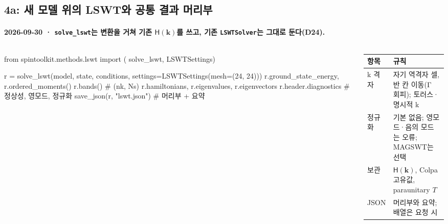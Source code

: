 \subsection{4a: 새 모델 위의 LSWT와 공통 결과 머리부}\label{stage4a-api}
\begingroup%
  \framesubtitle{2026-09-30 · \texttt{solve\_lswt}는 변환을 거쳐 기존 $\mathsf H(\mathbf k)$를 쓰고, 기존 \texttt{LSWTSolver}는 그대로 둔다(D24).}
  \begin{columns}[T,onlytextwidth]
    \begin{column}{0.52\textwidth}
\begin{semiverbatim}\scriptsize
from spintoolkit.methods.lswt import (
    solve_lswt, LSWTSettings)

r = solve_lswt(model, state, conditions,
               settings=LSWTSettings(mesh=(24, 24)))
r.ground_state_energy, r.ordered_moments()
r.bands()                  # (nk, Ns)
r.hamiltonians, r.eigenvalues, r.eigenvectors
r.header.diagnostics       # 정상성, 영모드, 정규화
save_json(r, "lswt.json")  # 머리부 + 요약
\end{semiverbatim}
    \end{column}
    \begin{column}{0.45\textwidth}
      \small
      \begin{tabular}{@{}P{1.6cm}P{3.4cm}@{}}
        \toprule
        항목 & 규칙 \\
        \midrule
        k 격자 & 자기 역격자 셀, 반 칸 이동(Γ 회피); 토러스·명시적 k \\
        정규화 & 기본 없음; 영모드·음의 모드는 오류; MAGSWT는 선택 \\
        보관 & $\mathsf H(\mathbf k)$, Colpa 고유값, paraunitary $T$ \\
        JSON & 머리부와 요약; 배열은 요청 시 \\
        \bottomrule
      \end{tabular}
    \end{column}
  \end{columns}
  \par\medskip
\endgroup


